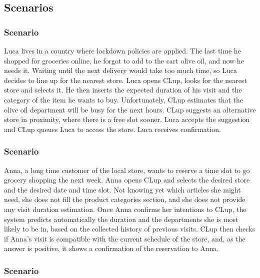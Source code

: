 \documentclass[../../main.tex]{subfiles}
\begin{document}
    \subsection{Scenarios}

      
      \subsubsection{Scenario }

        Luca lives in a country where lockdown policies are applied. The last time he shopped for groceries online, 
        he forgot to add to the cart olive oil, and now he needs it. Waiting until the next delivery would take too much time, 
        so Luca decides to line up for the nearest store. 
        Luca opens CLup, looks for the nearest store and selects it. 
        He then inserts the expected duration of his visit and the category of the item he wants to buy. 
        Unfortunately, CLup estimates that the olive oil department will be busy for the next hours. 
        CLup suggests an alternative store in proximity, where there is a free slot sooner. 
        Luca accepts the suggestion and CLup queues Luca to access the store. Luca receives confirmation.

      \subsubsection{Scenario }

        Anna, a long time customer of the local store, wants to reserve a time slot to go grocery shopping the next week. 
        Anna opens CLup and selects the desired store and the desired date and time slot. 
        Not knowing yet which articles she might need, she does not fill the product categories section, 
        and she does not provide any visit duration estimation. Once Anna confirms her intentions to CLup, 
        the system predicts automatically the duration and the departments she is most likely to be in, 
        based on the collected history of previous visits. CLup then checks if Anna's visit is compatible with the 
        current schedule of the store, and, as the answer is positive, it shows a confirmation of the reservation to Anna.

      \subsubsection{Scenario }
\end{document}
